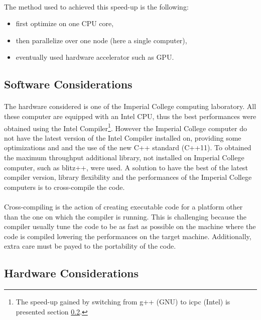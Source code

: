 \documentclass[fleqn,11pt]{SelfArx} %
\begin{document}
\paragraph{}
The method used to achieved this speed-up is the following:
\begin{itemize}  \vspace{-4mm}
\item first optimize on one CPU core, \vspace{-4mm}
\item then parallelize over one node (here a single computer), \vspace{-4mm}
\item eventually used hardware accelerator such as GPU.
\end{itemize}

\subsection{Software Considerations}
\paragraph{}
The hardware considered is one of the Imperial College computing laboratory. All these computer are equipped with an Intel CPU, thus the best performances were obtained using the Intel Compiler\footnote{The speed-up gained by switching from g++ (GNU) to icpc (Intel) is presented section \ref{}.}. However the Imperial College computer do not have the latest version of the Intel Compiler installed on, providing some optimizations and and the use of the new C++ standard (C++11). To obtained the maximum throughput additional library, not installed on Imperial College computer, such as blitz++, were used. A solution to have the best of the latest compiler version, library flexibility and the performances of the Imperial College computers is to cross-compile the code.
\paragraph{}
Cross-compiling is the action of creating executable code for a platform other than the one on which the compiler is running. This is challenging because the compiler usually tune the code to be as fast as possible on the machine where the code is compiled lowering the performances on the target machine. Additionally, extra care must be payed to the portability of the code.


\FloatBarrier
\subsection{Hardware Considerations}
\end{document}
